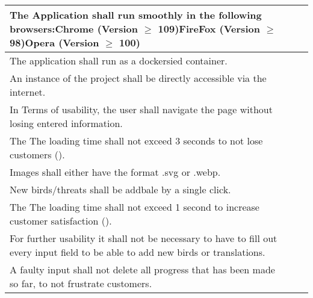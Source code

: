 \begin{xltabular}{\textwidth}{|X|M{2cm}|M{2cm}|}
\hline 
 \endlastfoot 
The Application shall run smoothly in the following browsers:\newline  Chrome (Version $\ge$ 109)\newline \newline FireFox (Version $\ge$ 98)\newline  \newline  Opera (Version $\ge$ 100) &  &  \\ \hline 
  The application shall run as a dockersied container. &  &  \\ \hline 
  An instance of the project shall be directly accessible via the internet. &  &  \\ \hline 
  In Terms of usability, the user shall navigate the page without losing entered information. &  &  \\ \hline 
  The The loading time shall not exceed 3 seconds to not lose customers (\cite{LoadTime}). &  &  \\ \hline 
  Images shall either have the format .svg or .webp. &  &  \\ \hline 
  New birds/threats shall be addbale by a single click. &  &  \\ \hline 
  The The loading time shall not exceed 1 second to increase customer satisfaction (\cite{LoadTime}). &  &  \\ \hline 
  For further usability it shall not be necessary to have to fill out every input field to be able to add new birds or translations. &  &  \\ \hline 
  A faulty input shall not delete all progress that has been made so far, to not frustrate customers. &  &  \\ \hline 
  
\end{xltabular} 
 \egroup 
 \color{default}